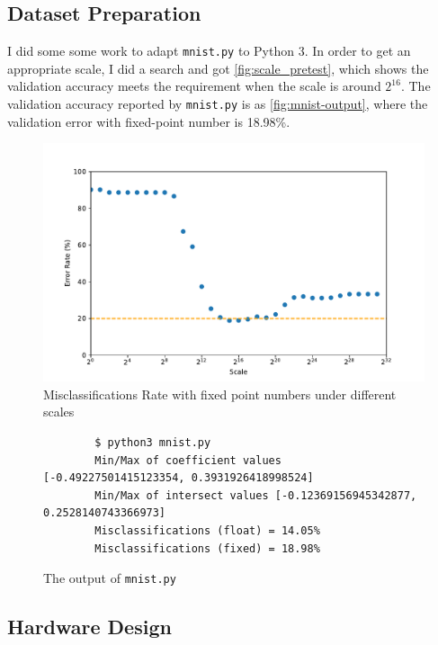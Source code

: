 \label{sec:fixed}

\subsection{Dataset Preparation}

I did some some work to adapt \nolinkurl{mnist.py} to Python 3.
In order to get an appropriate scale, I did a search and got \autoref{fig:scale_pretest}, which shows the validation accuracy meets the requirement when the scale is around \(2^{16}\).
The validation accuracy reported by \nolinkurl{mnist.py} is as \autoref{fig:mnist-output}, where the validation error with fixed-point number is 18.98\%.

\begin{figure}[ht!]
    \centering
    \includegraphics[scale=0.64]{images/scale_pretest.pdf}
    \caption{Misclassifications Rate with fixed point numbers under different scales}
    \label{fig:scale_pretest}
\end{figure}

\begin{figure}[ht!]
    \begin{verbatim}
        $ python3 mnist.py
        Min/Max of coefficient values [-0.49227501415123354, 0.3931926418998524]
        Min/Max of intersect values [-0.12369156945342877, 0.2528140743366973]
        Misclassifications (float) = 14.05%
        Misclassifications (fixed) = 18.98%
    \end{verbatim}
    \caption{The output of \nolinkurl{mnist.py}}
    \label{fig:mnist-output}
\end{figure}

\subsection{Hardware Design}

